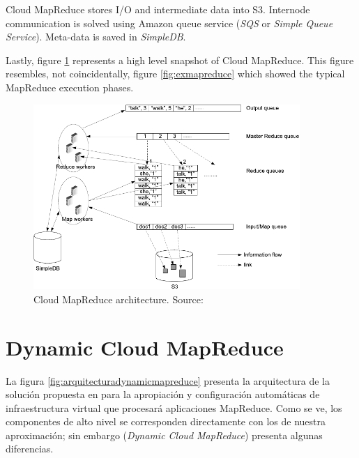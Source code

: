 Cloud MapReduce stores I/O and intermediate data into S3. Internode communication is solved using Amazon queue service (\emph{SQS} or \emph{Simple Queue Service}). Meta-data is saved in \emph{SimpleDB}.

Lastly, figure \ref{fig:arquitecturacloudmapreduce} represents a high level snapshot of Cloud MapReduce. This figure resembles, not coincidentally, figure \ref{fig:exmapreduce} which showed the typical MapReduce execution phases.

\begin{figure}[tbp]
\begin{center}
\includegraphics[width=0.9\textwidth]{imagenes/036.pdf}
 \caption{Cloud MapReduce architecture. Source: \cite{cloudmapreduce}}
\label{fig:arquitecturacloudmapreduce}
\end{center}
\end{figure}

\section{Dynamic Cloud MapReduce}\label{sec:dynamicmapreduce}
\noindent La figura \ref{fig:arquitecturadynamicmapreduce} presenta la arquitectura de la soluci\'on propuesta en \cite{dynamicmapreduce} para la apropiaci\'on y configuraci\'on autom\'aticas de infraestructura virtual que procesar\'a aplicaciones MapReduce. Como se ve, los componentes de alto nivel se corresponden directamente con los de nuestra aproximaci\'on; sin embargo (\emph{Dynamic Cloud MapReduce}) presenta algunas diferencias.

